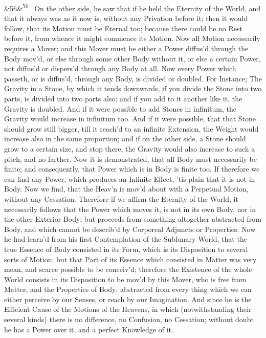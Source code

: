 \documentclass[12pt]{article}
\newcommand{\para}[1][]{\par\noindent\ifx&#1&\else\textsuperscript{\footnotesize #1}~\fi}
\begin{document}
\para[56] On the other side, he saw that if he held the Eternity of the World, and that it always was as it now is, without any Privation before it; then it would follow, that its Motion must be Eternal too; because there could be no Rest before it, from whence it might commence its Motion. Now all Motion necessarily requires a Mover; and this Mover must be either a Power diffus'd through the Body mov'd, or else through some other Body without it, or else a certain Power, not diffus'd or dispers'd through any Body at all. Now every Power which passeth, or is diffus'd, through any Body, is divided or doubled. For Instance; The Gravity in a Stone, by which it tends downwards, if you divide the Stone into two parts, is divided into two parts also; and if you add to it another like it, the Gravity is doubled. And if it were possible to add Stones in infinitum, the Gravity would increase in infinitum too. And if it were possible, that that Stone should grow still bigger, till it reach'd to an infinite Extension, the Weight would increase also in the same proportion; and if on the other side, a Stone should grow to a certain size, and stop there, the Gravity would also increase to such a pitch, and no farther. Now it is demonstrated, that all Body must necessarily be finite; and consequently, that Power which is in Body is finite too. If therefore we can find any Power, which produces an Infinite Effect, 'tis plain that it is not in Body. Now we find, that the Heav'n is mov'd about with a Perpetual Motion, without any Cessation. Therefore if we affirm the Eternity of the World, it necessarily follows that the Power which moves it, is not in its own Body, nor in the other Exterior Body; but proceeds from something altogether abstracted from Body, and which cannot be describ'd by Corporeal Adjuncts or Properties. Now he had learn'd from his first Contemplation of the Sublunary World, that the true Essence of Body consisted in its Form, which is its Disposition to several sorts of Motion; but that Part of its Essence which consisted in Matter was very mean, and scarce possible to be conceiv'd; therefore the Existence of the whole World consists in its Disposition to be mov'd by this Mover, who is free from Matter, and the Properties of Body; abstracted from every thing which we can either perceive by our Senses, or reach by our Imagination. And since he is the Efficient Cause of the Motions of the Heavens, in which (notwithstanding their several kinds) there is no difference, no Confusion, no Cessation; without doubt he has a Power over it, and a perfect Knowledge of it.
\end{document}

